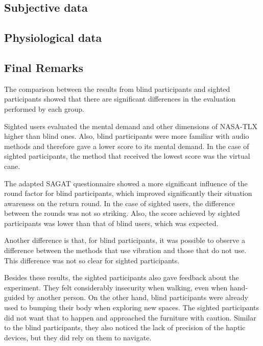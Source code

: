 %
\subsection{Subjective data}




\subsection{Physiological data}




\subsection{Final Remarks}

The comparison between the results from blind participants and sighted participants showed that there are significant differences in the evaluation performed by each group.

Sighted users evaluated the mental demand and other dimensions of NASA-TLX higher than blind ones. Also, blind participants were more familiar with audio methods and therefore gave a lower score to its mental demand. In the case of sighted participants, the method that received the lowest score was the virtual cane. 

The adapted SAGAT questionnaire showed a more significant influence of the round factor for blind participants, which improved significantly their situation awareness on the return round. In the case of sighted users, the difference between the rounds was not so striking. Also, the score achieved by sighted participants was lower than that of blind users, which was expected.

Another difference is that, for blind participants, it was possible to observe a difference between the methods that use vibration and those that do not use. This difference was not so clear for sighted participants. 

Besides these results, the sighted participants also gave feedback about the experiment. They felt considerably insecurity when walking, even when hand-guided by another person. On the other hand, blind participants were already used to bumping their body when exploring new spaces. The sighted participants did not want that to happen and approached the furniture with caution. Similar to the blind participants, they also noticed the lack of precision of the haptic devices, but they did rely on them to navigate.